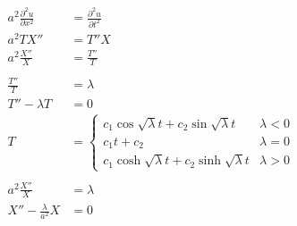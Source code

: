 \documentclass{article}
\begin{document}
\begin{align*}
  a^2 \frac{\partial^2 u}{\partial x^2} & = \frac{\partial^2 u}{\partial t^2}                                                                                                                                       \\
  a^2 T X''                             & = T'' X                                                                                                                                                                   \\
  a^2 \frac{X''}{X}                     & = \frac{T''}{T}                                                                                                                                                           \\ \\
  \frac{T''}{T}                         & = \lambda                                                                                                                                                                 \\
  T'' - \lambda T                       & = 0                                                                                                                                                                       \\
  T                                     & = \begin{cases}
                                              c_1 \cos \sqrt{\lambda} t + c_2 \sin \sqrt{\lambda} t   & \lambda < 0 \\
                                              c_1 t + c_2                                             & \lambda = 0 \\
                                              c_1 \cosh \sqrt{\lambda} t + c_2 \sinh \sqrt{\lambda} t & \lambda > 0
                                            \end{cases}                                                                                                   \\ \\
  a^2 \frac{X''}{X}                     & = \lambda                                                                                                                                                                 \\
  X'' - \frac{\lambda}{a^2} X           & = 0                                                                                                                                                                       \\

\end{align*}
\end{document}
